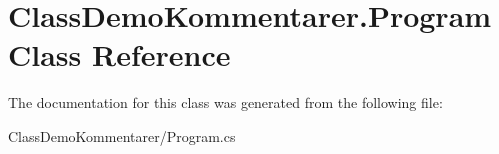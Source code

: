 \hypertarget{class_class_demo_kommentarer_1_1_program}{}\section{Class\+Demo\+Kommentarer.\+Program Class Reference}
\label{class_class_demo_kommentarer_1_1_program}


The documentation for this class was generated from the following file\+:\begin{DoxyCompactItemize}
\item 
Class\+Demo\+Kommentarer/Program.\+cs\end{DoxyCompactItemize}

